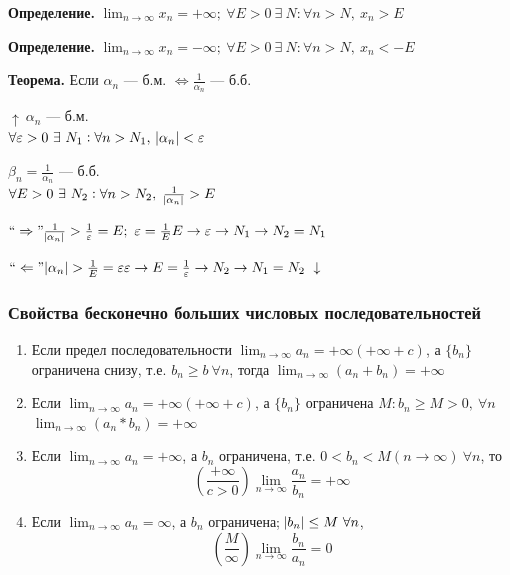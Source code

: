 \documentclass{article}
\begin{document}
    \textbf{Определение.} \(\lim_{n \rightarrow \infty}{x_n} = +\infty;\ \forall E > 0\ \exists\ N : \forall n > N,\ x_n > E\)
    
    \textbf{Определение.} \(\lim_{n \rightarrow \infty}{x_n} = -\infty;\ \forall E > 0\ \exists\ N : \forall n > N,\ x_n < -E\)
    
    \textbf{Теорема.} Если \(\alpha_n\) --- б.м. \(\Leftrightarrow \frac{1}{\alpha_n}\) --- б.б.
    
    \(\uparrow\ \alpha_n\) --- б.м.\\
    \(\forall \varepsilon > 0\ \exists\ N_1 : \forall n > N_1,\ \abs{\alpha_n} < \varepsilon\)
    
    \(\beta_n = \frac{1}{\alpha_n}\) --- б.б.\\
    \(\forall E > 0\ \exists\ N_2 : \forall n > N_2,\ \frac{1}{\abs{\alpha_n}} > E\)
    
    \(``\Rightarrow" \frac{1}{\abs{\alpha_n}} > \frac{1}{\varepsilon} = E;\ \varepsilon = \frac{1}{E}\\
    E \rightarrow \varepsilon \rightarrow N_1 \rightarrow N_2 = N_1\)
    
    \(``\Leftarrow" \abs{\alpha_n} > \frac{1}{E} = \varepsilon\\
    \varepsilon \rightarrow E = \frac{1}{\varepsilon} \rightarrow N_2 \rightarrow N_1 = N_2\ \downarrow\)
    
    \subsubsection{Свойства бесконечно больших числовых последовательностей}
    
    \begin{enumerate}
        \item Если предел последовательности \( \lim_{n \rightarrow \infty }a_n = + \infty \)\( (+\infty + c) \), а \( \{b_n\} \) ограничена снизу, т.е. \( b_n \geq b\ \forall n \), тогда \(\lim_{n \rightarrow \infty}{(a_n + b_n)} = +\infty\)
       
        \item Если \( \lim_{n \rightarrow \infty }a_n = + \infty \)\( (+\infty + c) \), а \( \{b_n\} \) ограничена \( M: b_n \geq M > 0,\ \forall n \)
    \(\lim_{n \rightarrow \infty}{(a_n * b_n)} = +\infty\)

        \item Если \( \lim_{n \rightarrow \infty }a_n = +\infty \), а \( b_n \) ограничена, т.е. \( 0 < b_n < M (n \rightarrow \infty)\ \forall n \), то \[ (\frac{+\infty}{c > 0}) \lim_{n \rightarrow \infty}{\frac{a_n}{b_n}} = +\infty\]
    
        \item Если \(\lim_{n \rightarrow \infty}{a_n} = \infty\), а \(b_n\) ограничена; \(\abs{b_n} \leq M\  \forall n\), \[ (\frac{M}{\infty}) \lim_{n \rightarrow \infty }\frac{b_n}{a_n} = 0\]
    \end{enumerate}
    
\end{document}
